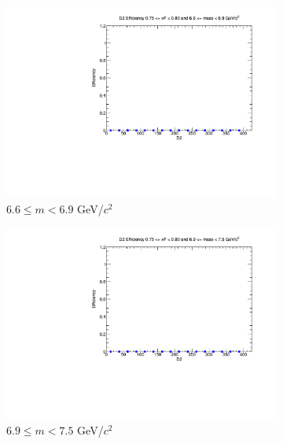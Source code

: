 \begin{figure}[p]
\begin{subfigure}[b]{0.32\textwidth}
        \includegraphics[width=\textwidth]{./kTrackerEfficiencyPlots/D2_Efficiency_xF15_mass8.pdf}
        \caption{$6.6 \leq m < 6.9$ GeV/$c^2$}
        \label{fig:xF15_mass8}
    \end{subfigure}
    \vspace{0.5cm}
    \begin{subfigure}[b]{0.32\textwidth}
        \centering
        \includegraphics[width=\textwidth]{./kTrackerEfficiencyPlots/D2_Efficiency_xF15_mass9.pdf}
        \caption{$6.9 \leq m < 7.5$ GeV/$c^2$}
        \label{fig:xF15_mass9}
    \end{subfigure}
    \hfill
    \begin{subfigure}[b]{0.32\textwidth}
        \centering

\end{subfigure}
\end{figure}
